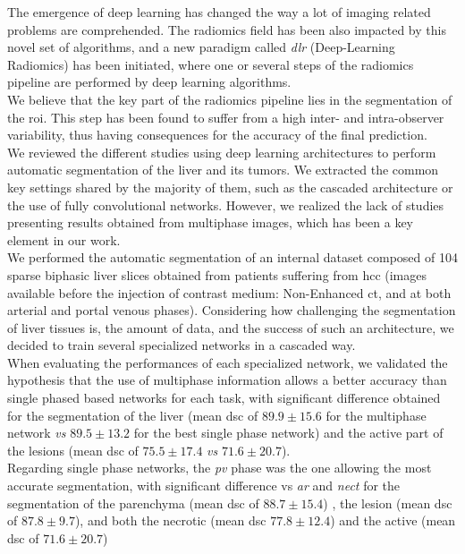 The emergence of deep learning has changed the way a lot of imaging
related problems are comprehended.
The radiomics field has been also impacted by this novel set of
algorithms, and a new paradigm called \emph{\ac{dlr}} (Deep-Learning
Radiomics) has been initiated, where one or several steps of the
radiomics pipeline are performed by deep learning algorithms.\\
We believe that the key part of the radiomics pipeline lies in the
segmentation of the \ac{roi}. This step has been found to suffer from a high
inter- and intra-observer variability, thus having consequences for the
accuracy of the final prediction. \\
We reviewed the different studies using deep learning architectures to
perform automatic segmentation of the liver and its tumors. We extracted
the common key settings shared by the majority of them, such as the
cascaded architecture or the use of fully convolutional networks.
However, we realized the lack of studies presenting results obtained
from multiphase images, which has been a key element in our work. \\
We performed the automatic segmentation of an internal dataset composed
of 104 sparse biphasic liver slices obtained from patients suffering
from \ac{hcc} (images available before the injection of contrast medium:
Non-Enhanced \ac{ct}, and at both arterial and portal venous phases).
Considering how challenging the segmentation of liver tissues is, the
amount of data, and the success of such an architecture, we decided to
train several specialized networks in a cascaded way.\\
When evaluating the performances of each specialized network, we
validated the hypothesis that the use of multiphase information allows a
better accuracy than single phased based networks for each task,
with significant difference obtained for the segmentation of the liver
(mean \ac{dsc} of $ 89.9 \pm 15.6 $ for the multiphase network \emph{vs} $ 89.5 \pm
13.2 $ for the best single phase network) and the active part of the
lesions (mean \ac{dsc} of $ 75.5 \pm 17.4 $ \emph{vs} $ 71.6 \pm 20.7 $).\\
Regarding single phase networks, the \emph{\ac{pv}} phase was the one
allowing the most accurate segmentation, with significant difference vs
\emph{\ac{ar}} and \emph{\ac{nect}} for the segmentation of the parenchyma (mean
\ac{dsc} of $ 88.7 \pm 15.4 $) , the lesion (mean \ac{dsc} of $ 87.8 \pm 9.7 $), and both the
necrotic (mean \ac{dsc} $ 77.8 \pm 12.4 $) and the active (mean \ac{dsc} of $ 71.6 \pm 20.7 $)
